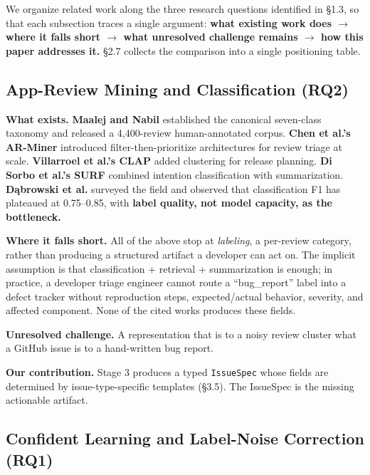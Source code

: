 \documentclass[sigconf, nonacm, anonymous, balance=false]{acmart}
\begin{document}
We organize related work along the three research questions identified in \S1.3, so that each subsection traces a single argument: \textbf{what existing work does $\rightarrow$ where it falls short $\rightarrow$ what unresolved challenge remains $\rightarrow$ how this paper addresses it.} \S2.7 collects the comparison into a single positioning table.

\subsection{App-Review Mining and Classification (RQ2)}\label{app-review-mining-and-classification-gap-g2}

\textbf{What exists.} \textbf{Maalej and Nabil} \cite{maalej2016} established the canonical seven-class taxonomy and released a 4,400-review human-annotated corpus. \textbf{Chen et al.'s AR-Miner} \cite{chen2014arminer} introduced filter-then-prioritize architectures for review triage at scale. \textbf{Villarroel et al.'s CLAP} \cite{villarroel2016} added clustering for release planning. \textbf{Di Sorbo et al.'s SURF} \cite{disorbo2016surf} combined intention classification with summarization. \textbf{Dąbrowski et al.} \cite{dabrowski2022analysing} surveyed the field and observed that classification F1 has plateaued at 0.75--0.85, with \textbf{label quality, not model capacity, as the bottleneck.}

\textbf{Where it falls short.} All of the above stop at \emph{labeling}, a per-review category, rather than producing a structured artifact a developer can act on. The implicit assumption is that classification + retrieval + summarization is enough; in practice, a developer triage engineer cannot route a ``bug\_report'' label into a defect tracker without reproduction steps, expected/actual behavior, severity, and affected component. None of the cited works produces these fields.

\textbf{Unresolved challenge.} A representation that is to a noisy review cluster what a GitHub issue is to a hand-written bug report.

\textbf{Our contribution.} Stage 3 produces a typed \texttt{IssueSpec} whose fields are determined by issue-type-specific templates (\S3.5). The IssueSpec is the missing actionable artifact.

\subsection{Confident Learning and Label-Noise Correction (RQ1)}\label{confident-learning-and-label-noise-correction-gap-g1-methodology}
\end{document}
